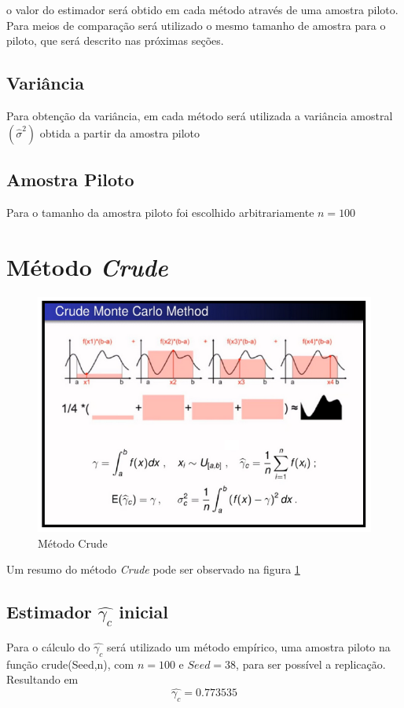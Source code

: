 \documentclass{article}
\begin{document}
o valor do estimador será obtido em cada método através de uma amostra piloto. Para meios de comparação será utilizado o mesmo tamanho de amostra para o piloto, que será descrito nas próximas seções. 

\subsection{Variância}

Para obtenção da variância, em cada método será utilizada a variância amostral $(\hat{\sigma}^2)$ obtida a partir da amostra piloto

\subsection{Amostra Piloto}

Para o tamanho da amostra piloto foi escolhido arbitrariamente $n=100$

\section{Método \textit{Crude}}

\begin{figure}[H]
    \centering
    \includegraphics[width=.7\linewidth]{Imagens/MC_Crude.png}
    \caption{Método Crude}
    \label{fig:Crude}
\end{figure}

Um resumo do método \textit{Crude} pode ser observado na figura \ref{fig:Crude} 

\subsection{Estimador $\hat{\gamma_c}$ inicial}
Para o cálculo do $\hat{\gamma_c}$ será utilizado um método empírico, uma amostra piloto na função crude(Seed,n), com $n=100$ e $Seed=38$, para ser possível a replicação.
Resultando em $$\hat{\gamma_c} = 0.773535$$
\end{document}

